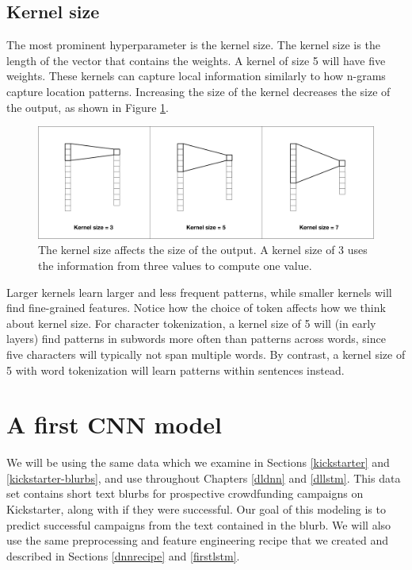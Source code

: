 \documentclass[
]{krantz}
\begin{document}
\hypertarget{kernel-size}{%
\subsection{Kernel size}\label{kernel-size}}

The most prominent hyperparameter is the kernel size.
The kernel size is the length of the vector that contains the weights. A kernel of size 5 will have five weights. These kernels can capture local information similarly to how n-grams capture location patterns. Increasing the size of the kernel decreases the size of the output, as shown in Figure \ref{fig:cnn-kernel-size}.

\begin{figure}

{\centering \includegraphics[width=1\linewidth]{diagram-files/cnn-kernel-size} 

}

\caption{The kernel size affects the size of the output. A kernel size of 3 uses the information from three values to compute one value.}\label{fig:cnn-kernel-size}
\end{figure}

Larger kernels learn larger and less frequent patterns, while smaller kernels will find fine-grained features.
Notice how the choice of token affects how we think about kernel size.
For character tokenization, a kernel size of 5 will (in early layers) find patterns in subwords more often than patterns across words, since five characters will typically not span multiple words.
By contrast, a kernel size of 5 with word tokenization will learn patterns within sentences instead.

\hypertarget{firstcnn}{%
\section{A first CNN model}\label{firstcnn}}

We will be using the same data which we examine in Sections \ref{kickstarter} and \ref{kickstarter-blurbs}, and use throughout Chapters \ref{dldnn} and \ref{dllstm}. This data set contains short text blurbs for prospective crowdfunding campaigns on Kickstarter, along with if they were successful. Our goal of this modeling is to predict successful campaigns from the text contained in the blurb. We will also use the same preprocessing and feature engineering recipe that we created and described in Sections \ref{dnnrecipe} and \ref{firstlstm}.
\end{document}
